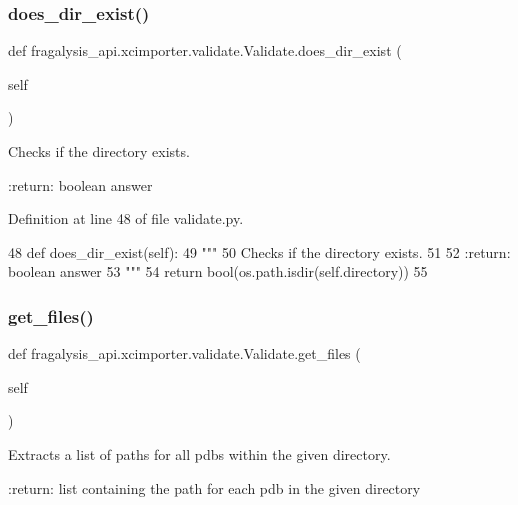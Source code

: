 \subsubsection{\texorpdfstring{does\+\_\+dir\+\_\+exist()}{does\_dir\_exist()}}
{\footnotesize\ttfamily def fragalysis\+\_\+api.\+xcimporter.\+validate.\+Validate.\+does\+\_\+dir\+\_\+exist (\begin{DoxyParamCaption}\item[{}]{self }\end{DoxyParamCaption})}

\begin{DoxyVerb}Checks if the directory exists.

:return: boolean answer
\end{DoxyVerb}
 

Definition at line 48 of file validate.\+py.


\begin{DoxyCode}
48     \textcolor{keyword}{def }does\_dir\_exist(self):
49         \textcolor{stringliteral}{"""}
50 \textcolor{stringliteral}{        Checks if the directory exists.}
51 \textcolor{stringliteral}{}
52 \textcolor{stringliteral}{        :return: boolean answer}
53 \textcolor{stringliteral}{        """}
54         \textcolor{keywordflow}{return} bool(os.path.isdir(self.directory))
55 
\end{DoxyCode}
\mbox{\label{classfragalysis__api_1_1xcimporter_1_1validate_1_1_validate_a0b6c43c8e26bc7b2bc5f2caf982f0a5e}} 
\subsubsection{\texorpdfstring{get\+\_\+files()}{get\_files()}}
{\footnotesize\ttfamily def fragalysis\+\_\+api.\+xcimporter.\+validate.\+Validate.\+get\+\_\+files (\begin{DoxyParamCaption}\item[{}]{self }\end{DoxyParamCaption})}

\begin{DoxyVerb}Extracts a list of paths for all pdbs within the given directory.

:return: list containing the path for each pdb in the given directory
\end{DoxyVerb}
 

